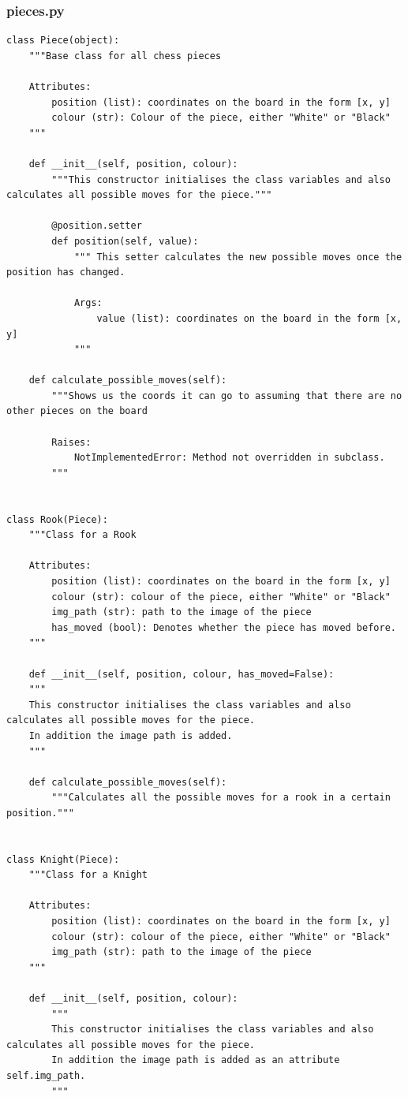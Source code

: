\documentclass[twoside, 12pt]{report}
\begin{document}
\subsubsection{pieces.py}
\begin{verbatim}
class Piece(object):
	"""Base class for all chess pieces

	Attributes:
		position (list): coordinates on the board in the form [x, y]
		colour (str): Colour of the piece, either "White" or "Black"
	"""
	
 	def __init__(self, position, colour):
		"""This constructor initialises the class variables and also calculates all possible moves for the piece."""
		
		@position.setter
		def position(self, value):
			""" This setter calculates the new possible moves once the position has changed.
		
			Args:
				value (list): coordinates on the board in the form [x, y]
			"""
	
 	def calculate_possible_moves(self):
		"""Shows us the coords it can go to assuming that there are no other pieces on the board
	
		Raises:
			NotImplementedError: Method not overridden in subclass.
		"""
		

class Rook(Piece):
	"""Class for a Rook

	Attributes:
		position (list): coordinates on the board in the form [x, y]
		colour (str): colour of the piece, either "White" or "Black"
		img_path (str): path to the image of the piece
		has_moved (bool): Denotes whether the piece has moved before.
	"""

    def __init__(self, position, colour, has_moved=False):
	"""
	This constructor initialises the class variables and also calculates all possible moves for the piece.
	In addition the image path is added.
	"""
	
 	def calculate_possible_moves(self):
		"""Calculates all the possible moves for a rook in a certain position."""
		

class Knight(Piece):
	"""Class for a Knight

	Attributes:
		position (list): coordinates on the board in the form [x, y]
		colour (str): colour of the piece, either "White" or "Black"
		img_path (str): path to the image of the piece
	"""

 	def __init__(self, position, colour):
		"""
		This constructor initialises the class variables and also calculates all possible moves for the piece.
		In addition the image path is added as an attribute self.img_path.
		"""
	

\end{verbatim}
\end{document}

